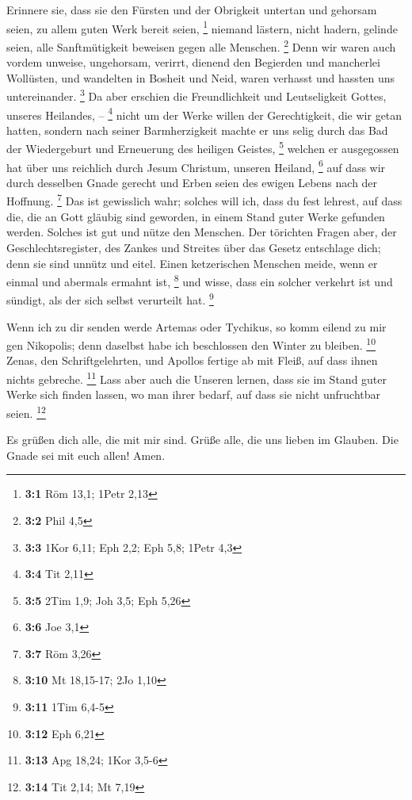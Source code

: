 Erinnere sie, dass sie den Fürsten und der Obrigkeit
untertan und gehorsam seien, zu allem guten Werk bereit seien,
\footnote{\textbf{3:1} Röm 13,1; 1Petr 2,13}  niemand
lästern, nicht hadern, gelinde seien, alle Sanftmütigkeit beweisen gegen
alle Menschen. \footnote{\textbf{3:2} Phil 4,5}  Denn wir
waren auch vordem unweise, ungehorsam, verirrt, dienend den Begierden
und mancherlei Wollüsten, und wandelten in Bosheit und Neid, waren
verhasst und hassten uns untereinander. \footnote{\textbf{3:3} 1Kor
  6,11; Eph 2,2; Eph 5,8; 1Petr 4,3}  Da aber erschien die
Freundlichkeit und Leutseligkeit Gottes, unseres Heilandes, --
\footnote{\textbf{3:4} Tit 2,11}  nicht um der Werke
willen der Gerechtigkeit, die wir getan hatten, sondern nach seiner
Barmherzigkeit machte er uns selig durch das Bad der Wiedergeburt und
Erneuerung des heiligen Geistes, \footnote{\textbf{3:5} 2Tim 1,9; Joh
  3,5; Eph 5,26}  welchen er ausgegossen hat über uns
reichlich durch Jesum Christum, unseren Heiland, \footnote{\textbf{3:6}
  Joe 3,1}  auf dass wir durch desselben Gnade gerecht und
Erben seien des ewigen Lebens nach der Hoffnung. \footnote{\textbf{3:7}
  Röm 3,26}  Das ist gewisslich wahr; solches will ich,
dass du fest lehrest, auf dass die, die an Gott gläubig sind geworden,
in einem Stand guter Werke gefunden werden. Solches ist gut und nütze
den Menschen.  Der törichten Fragen aber, der
Geschlechtsregister, des Zankes und Streites über das Gesetz entschlage
dich; denn sie sind unnütz und eitel.  Einen ketzerischen
Menschen meide, wenn er einmal und abermals ermahnt ist, \footnote{\textbf{3:10}
  Mt 18,15-17; 2Jo 1,10}  und wisse, dass ein solcher
verkehrt ist und sündigt, als der sich selbst verurteilt hat.
\footnote{\textbf{3:11} 1Tim 6,4-5}

 Wenn ich zu dir senden werde Artemas oder Tychikus, so
komm eilend zu mir gen Nikopolis; denn daselbst habe ich beschlossen den
Winter zu bleiben. \footnote{\textbf{3:12} Eph 6,21} 
Zenas, den Schriftgelehrten, und Apollos fertige ab mit Fleiß, auf dass
ihnen nichts gebreche. \footnote{\textbf{3:13} Apg 18,24; 1Kor 3,5-6}
 Lass aber auch die Unseren lernen, dass sie im Stand
guter Werke sich finden lassen, wo man ihrer bedarf, auf dass sie nicht
unfruchtbar seien. \footnote{\textbf{3:14} Tit 2,14; Mt 7,19}

 Es grüßen dich alle, die mit mir sind. Grüße alle, die
uns lieben im Glauben. Die Gnade sei mit euch allen! Amen.
